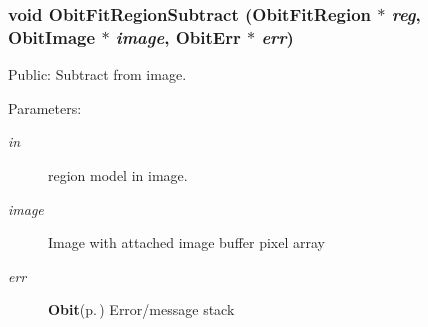 \subsubsection{\setlength{\rightskip}{0pt plus 5cm}void Obit\-Fit\-Region\-Subtract ({\bf Obit\-Fit\-Region} $\ast$ {\em reg}, {\bf Obit\-Image} $\ast$ {\em image}, {\bf Obit\-Err} $\ast$ {\em err})}\label{ObitFitRegion_8h_a12}


Public: Subtract from image. 

\begin{Desc}
\item[Parameters:]
\begin{description}
\item[{\em in}]region model in image. \item[{\em image}]Image with attached image buffer pixel array \item[{\em err}]{\bf Obit}{\rm (p.\,\pageref{structObit})} Error/message stack \end{description}
\end{Desc}
